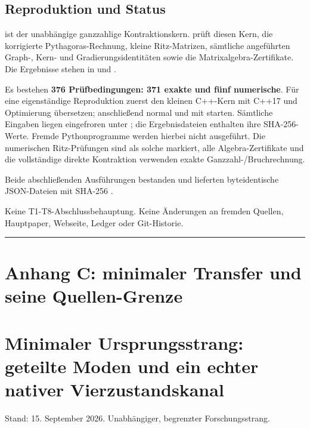\subsection{Reproduktion und Status}\label{reproduktion-und-status}

 ist der unabhängige ganzzahlige
Kontraktionskern.  prüft diesen Kern, die
korrigierte Pythagoras-Rechnung, kleine Ritz-Matrizen, sämtliche
angeführten Graph-, Kern- und Gradierungsidentitäten sowie die
Matrixalgebra-Zertifikate. Die Ergebnisse stehen in
 und .

Es bestehen \textbf{376 Prüfbedingungen: 371 exakte und fünf
numerische}. Für eine eigenständige Reproduktion zuerst den kleinen
C++-Kern mit C++17 und Optimierung übersetzen; anschließend
 normal und mit  starten. Sämtliche
Eingaben liegen eingefroren unter ; die
Ergebnisdateien enthalten ihre SHA-256-Werte. Fremde Pythonprogramme
werden hierbei nicht ausgeführt. Die numerischen Ritz-Prüfungen sind als
solche markiert, alle Algebra-Zertifikate und die vollständige direkte
Kontraktion verwenden exakte Ganzzahl-/Bruchrechnung.

Beide abschließenden Ausführungen bestanden und lieferten byteidentische
JSON-Dateien mit SHA-256
.

Keine T1-T8-Abschlussbehauptung. Keine Änderungen an fremden Quellen,
Hauptpaper, Webseite, Ledger oder Git-Historie.

\begin{center}\rule{0.5\linewidth}{0.5pt}\end{center}

\section{Anhang C: minimaler Transfer und seine
Quellen-Grenze}\label{anhang-c-minimaler-transfer-und-seine-quellen-grenze}

\section{Minimaler Ursprungsstrang: geteilte Moden und ein echter
nativer
Vierzustandskanal}\label{minimaler-ursprungsstrang-geteilte-moden-und-ein-echter-nativer-vierzustandskanal}

Stand: 15. September 2026. Unabhängiger, begrenzter Forschungsstrang.

